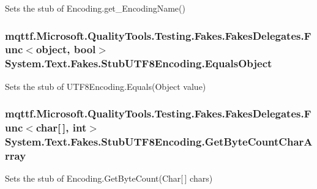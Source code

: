Sets the stub of Encoding.\-get\-\_\-\-Encoding\-Name()

\hypertarget{class_system_1_1_text_1_1_fakes_1_1_stub_u_t_f8_encoding_a7274369093d9dc4081fb44730cb9a4d3}{
\subsubsection[{Equals\-Object}]{\setlength{\rightskip}{0pt plus 5cm}mqttf.\-Microsoft.\-Quality\-Tools.\-Testing.\-Fakes.\-Fakes\-Delegates.\-Func$<$object, bool$>$ System.\-Text.\-Fakes.\-Stub\-U\-T\-F8\-Encoding.\-Equals\-Object}}\label{class_system_1_1_text_1_1_fakes_1_1_stub_u_t_f8_encoding_a7274369093d9dc4081fb44730cb9a4d3}


Sets the stub of U\-T\-F8\-Encoding.\-Equals(\-Object value)

\hypertarget{class_system_1_1_text_1_1_fakes_1_1_stub_u_t_f8_encoding_a51b19647ea071e6bedddb1293f53d0ee}{
\subsubsection[{Get\-Byte\-Count\-Char\-Array}]{\setlength{\rightskip}{0pt plus 5cm}mqttf.\-Microsoft.\-Quality\-Tools.\-Testing.\-Fakes.\-Fakes\-Delegates.\-Func$<$char\mbox{[}$\,$\mbox{]}, int$>$ System.\-Text.\-Fakes.\-Stub\-U\-T\-F8\-Encoding.\-Get\-Byte\-Count\-Char\-Array}}\label{class_system_1_1_text_1_1_fakes_1_1_stub_u_t_f8_encoding_a51b19647ea071e6bedddb1293f53d0ee}


Sets the stub of Encoding.\-Get\-Byte\-Count(\-Char\mbox{[}$\,$\mbox{]} chars)

